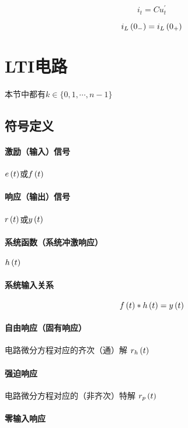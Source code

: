 \documentclass{article}
\begin{document}
\[i_t=Cu_t^\prime\]

\[i_L\left(0_-\right)=i_L\left(0_+\right)\]

\section{LTI电路}

本节中都有$k\in\{0,1,\cdots,n-1\}$

\subsection{符号定义}

\paragraph{激励（输入）信号}

$e\left(t\right)$或$f\left(t\right)$

\paragraph{响应（输出）信号}

$r\left(t\right)$或$y\left(t\right)$

\paragraph{系统函数（系统冲激响应）}

$h\left(t\right)$

\paragraph{系统输入关系}

\[f\left(t\right)\ast h\left(t\right)=y\left(t\right)\]

\paragraph{自由响应（固有响应）}

电路微分方程对应的齐次（通）解
$r_h\left(t\right)$

\paragraph{强迫响应}

电路微分方程对应的（非齐次）特解
$r_p\left(t\right)$

\paragraph{零输入响应}
\end{document}
